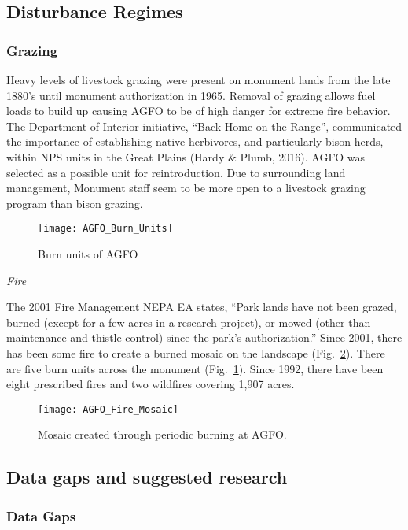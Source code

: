 \subsection{Disturbance Regimes }

\subsubsection{Grazing }

Heavy levels of livestock grazing were present on monument lands from the late 1880's until monument authorization in 1965. 
Removal of grazing allows fuel loads to build up causing AGFO to be of high danger for extreme fire behavior. 
The Department of Interior initiative, ``Back Home on the Range'', communicated the importance of establishing native herbivores, and particularly bison herds, within NPS units in the Great Plains (Hardy \& Plumb, 2016). 
AGFO was selected as a possible unit for reintroduction. 
Due to surrounding land management, Monument staff seem to be more open to a livestock grazing program than bison grazing.

\begin{figure}
	\centering
	\texttt{[image: AGFO\_Burn\_Units]}
	\caption{Burn units of AGFO}\label{fig:AGFOBurnUnits}
\end{figure}

\emph{Fire }

The 2001 Fire Management NEPA EA states, ``Park lands have not been grazed, burned (except for a few acres in a research project), or mowed (other than maintenance and thistle control) since the park's authorization.'' 
Since 2001, there has been some fire to create a burned
mosaic on the landscape (Fig.~\ref{fig:AGFOFireMosaic}). 
There are five burn units across the monument (Fig.~\ref{fig:AGFOBurnUnits}). 
Since 1992, there have been eight prescribed fires and two wildfires covering 1,907 acres.

\begin{figure} 
	\centering
	\texttt{[image: AGFO\_Fire\_Mosaic]}
	\caption{Mosaic created through periodic burning at AGFO.} \label{fig:AGFOFireMosaic}
\end{figure}

\subsection{Data gaps and suggested research}

\subsubsection{Data Gaps}

